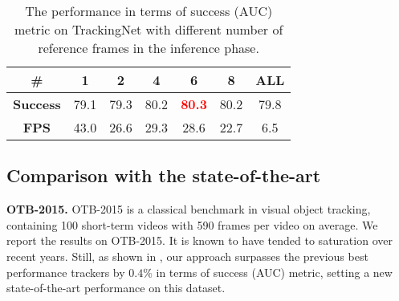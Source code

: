 \documentclass[final]{cvpr}
\begin{document}
\begin{table}[!tbp]
 \centering
 \caption{\label{tab:ablation_study_num_frames_for_testing}The performance in terms of success (AUC) metric on TrackingNet with different number of reference frames in the inference phase.}
 \vspace{-1.0em}
 \begin{tabular}{c|cccccc}
  \toprule
  \textbf{\#} & \textbf{1} & \textbf{2} & \textbf{4} & \textbf{6} & \textbf{8} & \textbf{ALL}  \\
  \midrule
  \textbf{Success} & 79.1 & 79.3 & 80.2 & \textcolor{red}{\textbf{80.3}} & 80.2 & 79.8 \\
  \textbf{FPS} & 43.0 & 26.6 & 29.3 & 28.6 & 22.7 & 6.5 \\
  \bottomrule
 \end{tabular}
 \vspace{-1.0em}
\end{table}

\subsection{Comparison with the state-of-the-art}
\textbf{OTB-2015.}
OTB-2015 \cite{otb2015} is a classical benchmark in visual object tracking, containing 100 short-term videos with 590 frames per video on average.
We report the results on OTB-2015.
It is known to have tended to saturation over recent years.
Still, as shown in , our approach surpasses the previous best performance trackers by $0.4\%$ in terms of success (AUC) metric, setting a new state-of-the-art performance on this dataset.
\end{document}
